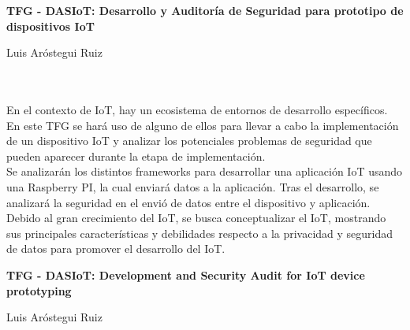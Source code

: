 \thispagestyle{empty}

\begin{center}
{\large\bfseries TFG - DASIoT: Desarrollo y Auditoría de Seguridad para prototipo de dispositivos IoT}\\
\end{center}
\begin{center}
Luis Aróstegui Ruiz\\
\end{center}

\vspace{0.5cm}
\\

\vspace{0.7cm}
\\

En el contexto de IoT, hay un ecosistema de entornos de desarrollo específicos. En este TFG se hará uso de alguno de ellos para llevar a cabo la implementación de un dispositivo IoT y analizar los potenciales problemas de seguridad que pueden aparecer durante la etapa de implementación. \\

Se analizarán los distintos frameworks para desarrollar una aplicación IoT usando una Raspberry PI, la cual enviará datos a la aplicación. Tras el desarrollo, se analizará la seguridad en el envió de datos entre el dispositivo y aplicación. \\

Debido al gran crecimiento del IoT, se busca conceptualizar el IoT, mostrando sus principales características y debilidades respecto a la privacidad y seguridad de datos para promover el desarrollo del IoT.

\cleardoublepage


\begin{center}
{\large\bfseries TFG - DASIoT: Development and Security Audit for IoT device prototyping}\\
\end{center}
\begin{center}
Luis Aróstegui Ruiz\\
\end{center}

\\

